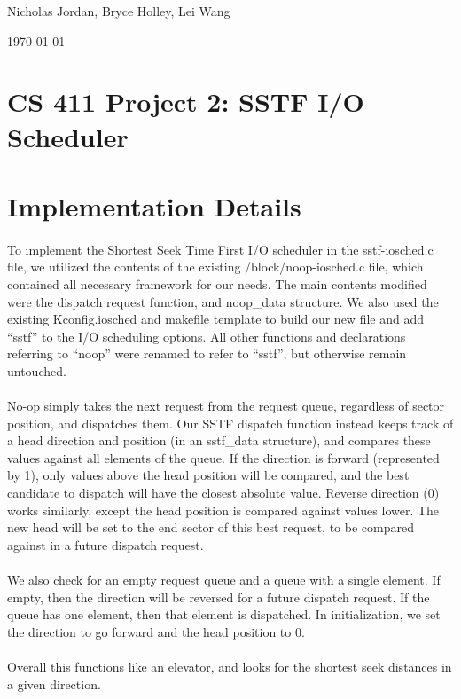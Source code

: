\documentclass[letterpaper,10pt]{article}
\def\name{Nicholas Jordan, Bryce Holley, Lei Wang}
\begin{document}
\hfill \name

\hfill \today

\section*{CS 411 Project 2: SSTF I/O Scheduler}
\section*{Implementation Details}
\paragraph{} 
To implement the Shortest Seek Time First I/O scheduler in the sstf-iosched.c file, we utilized the contents of the existing /block/noop-iosched.c file, which contained all necessary framework for our needs. The main contents modified were the dispatch request function, and noop\_data structure. We also used the existing Kconfig.iosched and makefile template to build our new file and add “sstf” to the I/O scheduling options. All other functions and declarations referring to “noop” were renamed to refer to “sstf”, but otherwise remain untouched.
\paragraph{} 
No-op simply takes the next request from the request queue, regardless of sector position, and dispatches them. Our SSTF dispatch function instead keeps track of a head direction and position (in an sstf\_data structure), and compares these values against all elements of the queue. If the direction is forward (represented by 1), only values above the head position will be compared, and the best candidate to dispatch will have the closest absolute value. Reverse direction (0) works similarly, except the head position is compared against values lower. The new head will be set to the end sector of this best request, to be compared against in a future dispatch request.
\paragraph{} 
We also check for an empty request queue and a queue with a single element. If empty, then the direction will be reversed for a future dispatch request. If the queue has one element, then that element is dispatched. In initialization, we set the direction to go forward and the head position to 0.
\\\\
Overall this functions like an elevator, and looks for the shortest seek distances in a given direction.
\end{document}
